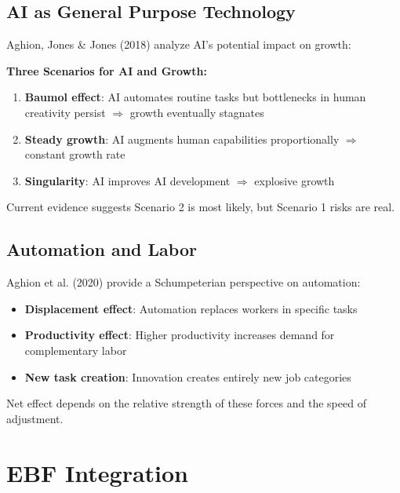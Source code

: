 \subsection{AI as General Purpose Technology}

Aghion, Jones \& Jones (2018) analyze AI's potential impact on growth:

\begin{tcolorbox}[colback=blue!5!white, colframe=blue!75!black]
\textbf{Three Scenarios for AI and Growth:}
\begin{enumerate}
    \item \textbf{Baumol effect}: AI automates routine tasks but bottlenecks in human creativity persist $\Rightarrow$ growth eventually stagnates
    \item \textbf{Steady growth}: AI augments human capabilities proportionally $\Rightarrow$ constant growth rate
    \item \textbf{Singularity}: AI improves AI development $\Rightarrow$ explosive growth
\end{enumerate}
Current evidence suggests Scenario 2 is most likely, but Scenario 1 risks are real.
\end{tcolorbox}

\subsection{Automation and Labor}

Aghion et al. (2020) provide a Schumpeterian perspective on automation:

\begin{itemize}
    \item \textbf{Displacement effect}: Automation replaces workers in specific tasks
    \item \textbf{Productivity effect}: Higher productivity increases demand for complementary labor
    \item \textbf{New task creation}: Innovation creates entirely new job categories
\end{itemize}

Net effect depends on the relative strength of these forces and the speed of adjustment.

\section{EBF Integration}


